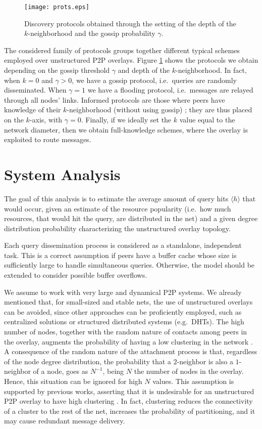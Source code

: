 \documentclass{sig-alternate}
\begin{document}
\begin{figure}[thbp]
   \centering
   \texttt{[image: prots.eps]}
  \vspace{-0.2cm}
\caption{Discovery protocols obtained through the setting of the depth of the $k$-neighborhood and the gossip probability $\gamma$.}
   \label{fig:prots}
\end{figure}

The considered family of protocols groups together different typical schemes employed over unstructured P2P overlays.
Figure \ref{fig:prots} shows the protocols we obtain depending on the gossip threshold $\gamma$ and depth of the $k$-neighborhood. In fact, when $k=0$ and $\gamma>0$, we have a gossip protocol, i.e.~queries are randomly disseminated. When $\gamma=1$ we have a flooding protocol, i.e.~messages are relayed through all nodes' links.
Informed protocols are those where peers have knowledge of their $k$-neighborhood (without using gossip) \cite{PuttaswamySZ08}; they are thus placed on the $k$-axis, with $\gamma=0$.
Finally, if we ideally set the $k$ value equal to the network diameter, then we obtain full-knowledge schemes, where the overlay is exploited to route messages.

\section{System Analysis}\label{sec:cn}

The goal of this analysis is to estimate the average amount of query hits $\langle h \rangle$ that would occur, given an estimate of the resource popularity (i.e.~how much resources, that would hit the query, are distributed in the net) and a given degree distribution probability characterizing the unstructured overlay topology. 

Each query dissemination process is considered as a standalone, independent task. This is a correct assumption if peers have a buffer cache whose size is sufficiently large to handle simultaneous queries. Otherwise, the model should be extended to consider possible buffer overflows. 

We assume to work with very large and dynamical P2P systems. We already mentioned that, for small-sized and stable nets, the use of unstructured overlays can be avoided, since other approaches can be proficiently employed, such as centralized solutions or structured distributed systems (e.g.~DHTs).
The high number of nodes, together with the random nature of contacts among peers in the overlay, augments the probability of having a low clustering in the network \cite{simplex,newmanHandbook}. 
A consequence of the random nature of the attachment process is that, regardless of the node degree distribution, the probability that a $2$-neighbor is also a $1$-neighbor of a node, goes as $N^{-1}$, being $N$ the number of nodes in the overlay. Hence, this situation can be ignored for high $N$ values. 
This assumption is supported by previous works, asserting that it is undesirable for an unstructured P2P overlay to have high clustering \cite{voulgaris.jnsm.2005}. In fact, clustering reduces the connectivity of a cluster to the rest of the net, increases the probability of partitioning, and it  may cause redundant message delivery. 
\end{document}
